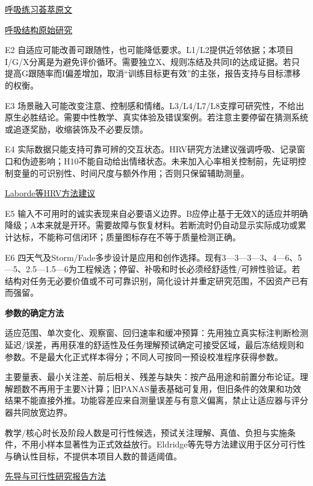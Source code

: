 \documentclass[11pt,a4paper]{article}
\newcommand{\reviewsubsection}[1]{\par\Needspace{4\baselineskip}\vspace{4pt}\begin{center}{\titlelatin\titlecjk\bfseries\fontsize{12}{18}\selectfont #1}\end{center}}
\begin{document}
\href{https://www.nature.com/articles/s41598-022-27247-y}{呼吸练习荟萃原文}


\href{https://doi.org/10.1016/j.xcrm.2022.100895}{呼吸结构原始研究}


E2 自适应可能改善可跟随性，也可能降低要求。L1/\allowbreak{}L2提供近邻依据；本项目I/\allowbreak{}G/\allowbreak{}X分离是为避免评价循环。需要独立X、规则冻结及共同I的达成证据。若只提高G跟随率而I偏差增加，取消“训练目标更有效”的主张，报告支持与目标漂移的权衡。


E3 场景融入可能改变注意、控制感和情绪。L3/\allowbreak{}L4/\allowbreak{}L7/\allowbreak{}L8支撑可研究性，不给出原生必胜结论。需要中性教学、真实体验及错误案例。若注意主要停留在猜测系统或追逐奖励，收缩装饰及不必要反馈。


E4 实际数据只能支持可靠可辨的交互状态。HRV研究方法建议强调呼吸、记录窗口和伪迹影响；H10不能自动给出情绪状态。未来加入心率相关控制前，先证明控制变量的可识别性、时间尺度与额外作用；否则只保留辅助测量。


\href{https://www.frontiersin.org/journals/psychology/articles/10.3389/fpsyg.2017.00213/full}{Laborde等HRV方法建议}


E5 输入不可用时的诚实表现来自必要语义边界。B应停止基于无效X的适应并明确降级；A本来就是开环。需要故障与恢复材料。若断流时仍自动显示实际成功或累计达标，不能称可信闭环；质量图标存在不等于质量检测正确。


E6 四天气及Storm/\allowbreak{}Fade多步设计是应用和创作选择。现有3—3—3—3、4—6、5—5、2.5—1.5—6为工程候选；停留、补吸和时长必须经舒适性/\allowbreak{}可辨性验证。若结构对任务无必要价值或不可可靠识别，简化设计并重定研究范围，不因资产已有而强留。


\reviewsubsection{4.2 参数的确定方法}
适应范围、单次变化、观察窗、回归速率和缓冲预算：先用独立真实标注判断检测延迟/\allowbreak{}误差，再用获准的舒适性及任务理解预试确定可接受区域，最后冻结规则和参数。不是最大化正式样本得分；不同人可按同一预设校准程序获得参数。


主要量表、最小关注差、前后相关、残差与缺失：按产品用途和前置分布论证。理解题数不再用于主要N计算；旧PANAS量表基础可复用，但旧条件的效果和功效结果不能直接外推。功能容差应来自测量误差与有意义偏离，禁止让适应器与评分器共同放宽边界。


教学/\allowbreak{}核心时长及阶段人数是可行性候选，预试关注理解、真值、负担与实施条件，不用小样本显著性为正式效益放行。Eldridge等先导方法建议用于区分可行性与确认性目标，不提供本项目人数的普适阈值。


\href{https://www.bmj.com/content/355/bmj.i5239}{先导与可行性研究报告方法}
\end{document}
